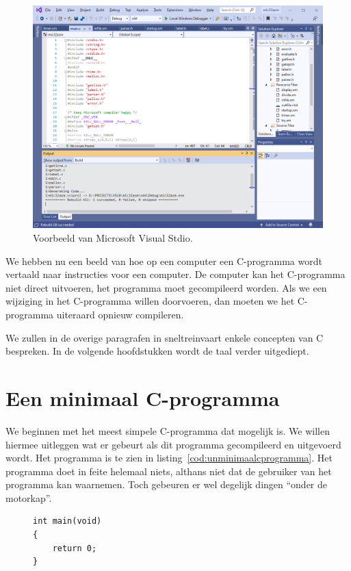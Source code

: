 \begin{figure}[!ht]
\centering
\includegraphics[width=\textwidth]{images/vs2019}
\caption{Voorbeeld van Microsoft Visual Stdio.}
\label{fig:unvs2019}
\end{figure}

We hebben nu een beeld van hoe op een computer een C-programma wordt vertaald naar instructies voor een computer. De computer kan het C-programma niet direct uitvoeren, het programma moet gecompileerd worden. Als we een wijziging in het C-programma willen doorvoeren, dan moeten we het C-programma uiteraard opnieuw compileren.

We zullen in de overige paragrafen in sneltreinvaart enkele concepten van C bespreken. In de volgende hoofdstukken wordt de taal verder uitgediept.


\section{Een minimaal C-programma}
We beginnen met het meest simpele C-programma dat mogelijk is. We willen hiermee uitleggen wat er gebeurt als dit programma gecompileerd en uitgevoerd wordt. Het programma is te zien in listing~\ref{cod:unminimaalcprogramma}. Het programma doet in feite helemaal niets, althans niet dat de gebruiker van het programma kan waarnemen. Toch gebeuren er wel degelijk dingen ``onder de motorkap''.


\begin{figure}[!ht]
\begin{lstlisting}[caption=Een minimaal C-programma.,label=cod:unminimaalcprogramma]
int main(void)
{
	return 0;
}
\end{lstlisting}
\end{figure}

